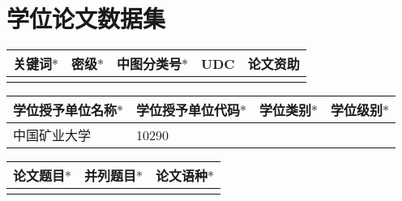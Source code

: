 \newpage
\pagestyle{plain}
\makeatletter
{}
\makeatother
\section*{\hspace*{\fill}学位论文数据集\hspace*{\fill}}

\makeatletter

\renewcommand\arraystretch{1.6}
{
	\renewcommand{\tabularxcolumn}[1]{m{#1}<{\centering}} %
	\centering
	\vskip 6pt
	{
		\begin{tabularx}{15.05cm}{|X|X|X|X|X|}
			\hline
			{\bfseries 关键词$\bm \ast$} & {\bfseries 密级$\bm \ast$} & {\bfseries 中图分类号$\bm \ast$} & {\bfseries UDC} & {\bfseries 论文资助} \\ \hline
			{   } & {   } & {   } & {   } & \\
			\hline
		\end{tabularx}
	}
	
	\vskip -1.3pt
	
	{
		\begin{tabularx}{15.05cm}{|X|X|X|X|}
			\hline
			{\bfseries 学位授予单位名称$\bm \ast$} & {\bfseries 学位授予单位代码$\bm \ast$} & {\bfseries 学位类别$\bm \ast$} &  {\bfseries 学位级别$\bm \ast$} \\ \hline
			中国矿业大学 & 10290 & {   } & {   }  \\
			\hline
		\end{tabularx}
	}
	
	\vskip -1.3pt
	
	{
		\begin{tabularx}{15.05cm}{|X|X|X|}
			\hline
			{\bfseries 论文题目$\bm \ast$} & {\bfseries 并列题目$\bm \ast$} & {\bfseries 论文语种$\bm \ast$} \\ \hline
			{  } & {  } & {   } \\
			\hline
		\end{tabularx}
	}
	
	\vskip -1.3pt
	
}
